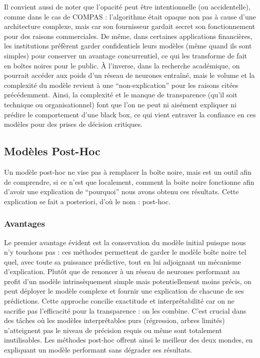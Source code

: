 \documentclass{article}
\begin{document}
Il convient aussi de noter que l’opacité peut être intentionnelle (ou accidentelle), comme dans le cas de COMPAS : l’algorithme était opaque non pas à cause d’une architecture complexe, mais car son fournisseur gardait secret son fonctionnement pour des raisons commerciales. De même, dans certaines applications financières, les institutions préfèrent garder confidentiels leurs modèles (même quand ils sont simples) pour conserver un avantage concurrentiel, ce qui les transforme de fait en boîtes noires pour le public. À l’inverse, dans la recherche académique, on pourrait accéder aux poids d’un réseau de neurones entraîné, mais le volume et la complexité du modèle revient à une “non-explication” pour les raisons citées précédemment. Ainsi, la complexité et le manque de transparence (qu’il soit technique ou organisationnel) font que l’on ne peut ni aisément expliquer ni prédire le comportement d’une black box, ce qui vient entraver la confiance en ces modèles pour des prises de décision critiques.

\subsection{Modèles Post-Hoc}

\quad Un modèle post-hoc ne vise pas à remplacer la boîte noire, mais est un outil afin de comprendre, si ce n’est que localement, comment la boite noire fonctionne afin d’avoir une explication de “pourquoi” nous avons obtenu ces résultats. Cette explication se fait a posteriori, d'où le nom : post-hoc.

    \subsubsection{Avantages}
    
    \quad Le premier avantage évident est la conservation du modèle initial puisque nous n’y touchons pas : ces méthodes permettent de garder le modèle boîte noire tel quel, avec toute sa puissance prédictive, tout en lui adjoignant un mécanisme d’explication. Plutôt que de renoncer à un réseau de neurones performant au profit d’un modèle intrinsèquement simple mais potentiellement moins précis, on peut déployer le modèle complexe et fournir une explication de chacune de ses prédictions. Cette approche concilie exactitude et interprétabilité car on ne sacrifie pas l’efficacité pour la transparence : on les combine. C’est crucial dans des tâches où les modèles interprétables purs (régression, arbres limités) n’atteignent pas le niveau de précision requis ou même sont totalement inutilisables. Les méthodes post-hoc offrent ainsi le meilleur des deux mondes, en expliquant un modèle performant sans dégrader ses résultats.\\
    
\end{document}
